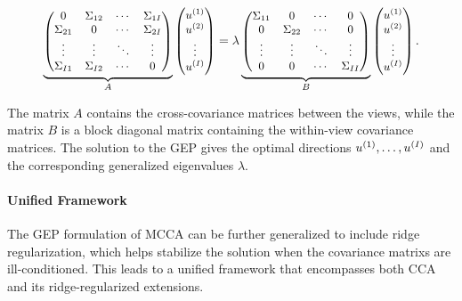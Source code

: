 \begin{align}
    \small
    \underbrace{\begin{pmatrix}
        0           & \Sigma_{12} & \cdots & \Sigma_{1I} \\
        \Sigma_{21} & 0           & \cdots & \Sigma_{2I} \\
        \vdots      & \vdots      & \ddots & \vdots      \\
        \Sigma_{I1} & \Sigma_{I2} & \cdots & 0
    \end{pmatrix}}_{A}
    \begin{pmatrix}
        u^{(1)} \\
        u^{(2)} \\
        \vdots   \\
        u^{(I)}
    \end{pmatrix}
    =
    \lambda
    \underbrace{\begin{pmatrix}
        \Sigma_{11} & 0           & \cdots & 0           \\
        0           & \Sigma_{22} & \cdots & 0           \\
        \vdots      & \vdots      & \ddots & \vdots      \\
        0           & 0           & \cdots & \Sigma_{II}
    \end{pmatrix}}_{B}
    \begin{pmatrix}
        u^{(1)} \\
        u^{(2)} \\
        \vdots   \\
        u^{(I)}
    \end{pmatrix}.
\end{align}

The matrix $A$ contains the cross-covariance matrices between the views, while the matrix $B$ is a block diagonal matrix containing the within-view covariance matrices. The solution to the GEP gives the optimal directions $u^{(1)}, \dots, u^{(I)}$ and the corresponding generalized eigenvalues $\lambda$.

\paragraph{Unified Framework}

The GEP formulation of MCCA can be further generalized to include ridge regularization, which helps stabilize the solution when the  \glspl{covariance matrix} are ill-conditioned. This leads to a unified framework that encompasses both CCA and its ridge-regularized extensions.


